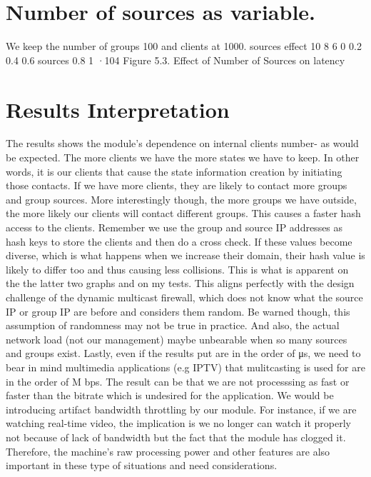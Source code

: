 \section{Number of sources as variable.} We keep the number of groups 100
and clients at 1000.
sources effect
10
8
6
0
0.2
0.4
0.6
sources
0.8
1
·104
Figure 5.3. Effect of Number of Sources on latency
\section{Results Interpretation}
The results shows the module’s dependence on internal clients number- as would
be expected. The more clients we have the more states we have to keep. In other
words, it is our clients that cause the state information creation by initiating those
contacts. If we have more clients, they are likely to contact more groups and group
sources.
More interestingly though, the more groups we have outside, the more likely
our clients will contact different groups. This causes a faster hash access to the
clients. Remember we use the group and source IP addresses as hash keys to store
the clients and then do a cross check. If these values become diverse, which is
what happens when we increase their domain, their hash value is likely to differ
too and thus causing less collisions. This is what is apparent on the the latter
two graphs and on my tests. This aligns perfectly with the design challenge of
the dynamic multicast firewall, which does not know what the source IP or group
IP are before and considers them random. Be warned though, this assumption of
randomness may not be true in practice. And also, the actual network load (not
our management) maybe unbearable when so many sources and groups exist.
Lastly, even if the results put are in the order of μs, we need to bear in mind
multimedia applications (e.g IPTV) that mulitcasting is used for are in the order of
M bps. The result can be that we are not processsing as fast or faster than the bitrate
which is undesired for the application. We would be introducing artifact bandwidth
throttling by our module. For instance, if we are watching real-time video, the
implication is we no longer can watch it properly not because of lack of bandwidth
but the fact that the module has clogged it. Therefore, the machine’s raw processing
power and other features are also important in these type of situations and need
considerations.

